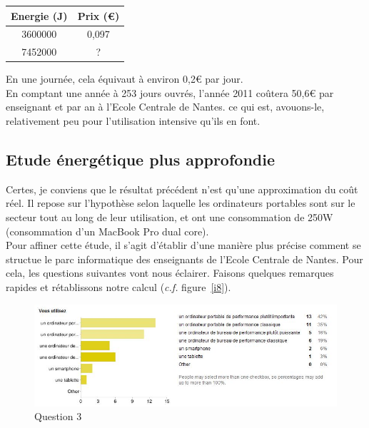 \documentclass[a4paper,11pt,french]{article}
\begin{document}
\begin{center}
\begin{tabular}{|c|c|}
\hline  Energie (J)	& Prix (\euro{})  \\ 
\hline  3600000 &  0,097\\ 
\hline  7452000 & ? \\ 
\hline 
\end{tabular} 
\end{center}

En une journée, cela équivaut à environ 0,2\euro{} par jour.\\

En comptant une année à 253 jours ouvrés, l'année 2011 coûtera 50,6\euro{} par enseignant et par an à l'Ecole Centrale de Nantes. ce qui est, avouons-le, relativement peu pour l'utilisation intensive qu'ils en font.\\



\subsection{Etude énergétique plus approfondie}

Certes, je conviens que le résultat précédent n'est qu'une approximation du coût réel. Il repose sur l'hypothèse selon laquelle les ordinateurs portables sont sur le secteur tout au long de leur utilisation, et ont une consommation de 250W (consommation d'un MacBook Pro dual core).\\

Pour affiner cette étude, il s'agit d'établir d'une manière plus précise comment se structue le parc informatique des enseignants de l'Ecole Centrale de Nantes. Pour cela, les questions suivantes vont nous éclairer. Faisons quelques remarques rapides et rétablissons notre calcul (\textit{c.f.} figure~\vref{i8}).\\

\begin{figure}[h!]
\includegraphics[width=\textwidth]{i8.JPG}
\caption{Question 3}
\label{i8}
\end{figure}
\end{document}
